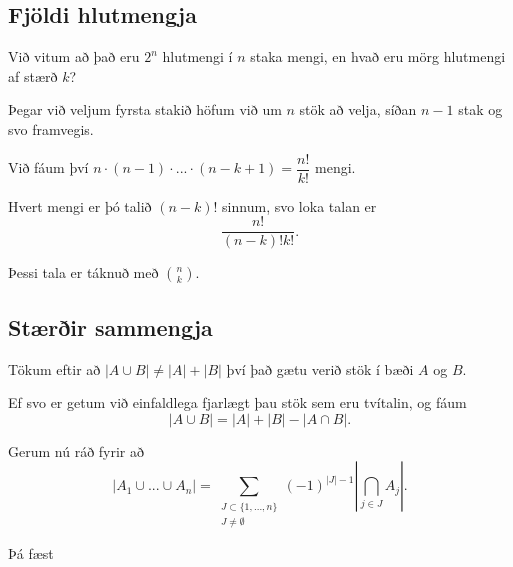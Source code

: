 \subsection{Fjöldi hlutmengja}
{
    {
        \item<1-> Við vitum að það eru $2^n$ hlutmengi í $n$ staka mengi, en hvað eru mörg hlutmengi af stærð $k$?
        \item<2-> Þegar við veljum fyrsta stakið höfum við um $n$ stök að velja, síðan $n - 1$ stak og svo framvegis.
        \item<3-> Við fáum því $n \cdot (n - 1) \cdot ... \cdot (n - k + 1) = \dfrac{n!}{k!}$ mengi.
        \item<4-> Hvert mengi er þó talið $(n - k)!$ sinnum, svo loka talan er
        \[
            \frac{n!}{(n - k)!k!}.
        \]
        \item<5-> Þessi tala er táknuð með ${n \choose k}$.
    }
}

\subsection{Stærðir sammengja}
{
    {
        \item<1-> Tökum eftir að $|A \cup B| \neq |A| + |B|$ því það gætu verið stök í bæði $A$ og $B$.
        \item<2-> Ef svo er getum við einfaldlega fjarlægt þau stök sem eru tvítalin, og fáum
        \[
            |A \cup B| = |A| + |B| - |A \cap B|.
        \]
        \item<3-> Gerum nú ráð fyrir að
        \[
            |A_1 \cup ... \cup A_n|
            =
            \sum_{\substack{J \subset \{1, ..., n\} \\ J \neq \emptyset}} (-1)^{|J| - 1} \left | \bigcap_{j \in J} A_j \right |.
        \]
        \item<4-> Þá fæst
    }
}

